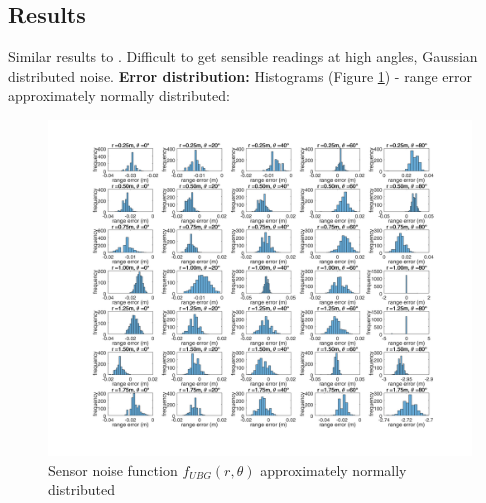 	\subsection{Results}
	Similar results to \cite{park2010characterization}. Difficult to get sensible readings at high angles, Gaussian distributed noise.
		\textbf{Error distribution:}
		Histograms (Figure \ref{fig:mean_hist}) - range error approximately normally distributed:
		\begin{figure}
		\centering
		  \includegraphics[width=1\textwidth,trim = 0mm 0mm 0mm 0mm,clip]{./Figures/range_error_histograms.jpg}
		  \caption{Sensor noise function $f_{UBG}(r,\theta)$ approximately normally distributed}
		  \label{fig:mean_hist}
		\end{figure}
		
